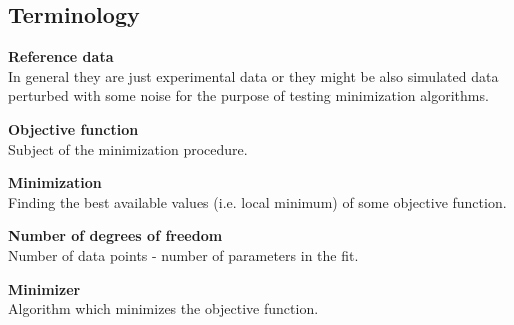 \subsection{Terminology}

\noindent
{\bf Reference data} \\
In general they are just experimental data or they might be also simulated data
perturbed  with some noise for the purpose of testing minimization algorithms.
\vspace*{1mm}

\noindent
{\bf Objective function} \\
Subject of the minimization procedure.
\vspace*{1mm}

\noindent
{\bf Minimization} \\
Finding the best available values (i.e. local minimum) of some objective function. 
\vspace*{1mm}

\noindent
{\bf Number of degrees of freedom} \\
Number of data points - number of parameters in the fit.
\vspace*{1mm}

\noindent
{\bf Minimizer} \\
Algorithm which minimizes the objective function. 


